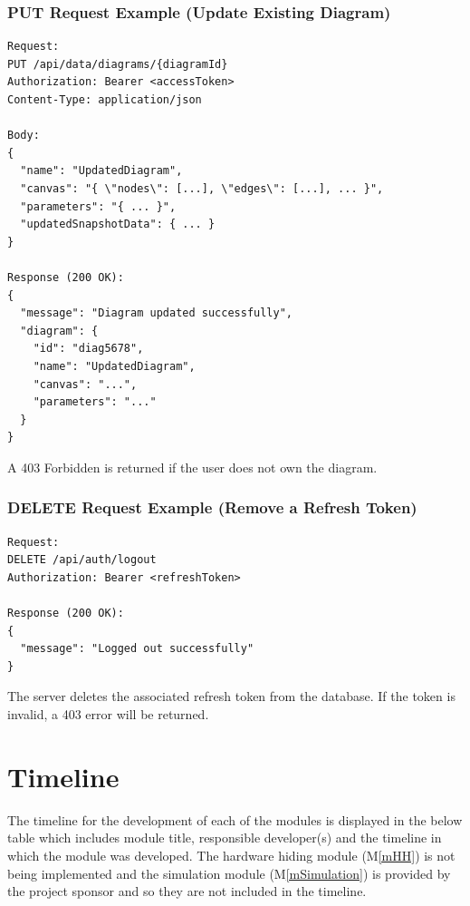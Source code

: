 \documentclass[12pt, titlepage]{article}
\newcommand{\mref}[1]{M\ref{#1}}
\begin{document}
\subsubsection{PUT Request Example (Update Existing Diagram)}

\begin{verbatim}
Request:
PUT /api/data/diagrams/{diagramId}
Authorization: Bearer <accessToken>
Content-Type: application/json

Body:
{
  "name": "UpdatedDiagram",
  "canvas": "{ \"nodes\": [...], \"edges\": [...], ... }",
  "parameters": "{ ... }",
  "updatedSnapshotData": { ... }
}

Response (200 OK):
{
  "message": "Diagram updated successfully",
  "diagram": {
    "id": "diag5678",
    "name": "UpdatedDiagram",
    "canvas": "...",
    "parameters": "..."
  }
}
\end{verbatim}

\noindent
A 403 Forbidden is returned if the user does not own the diagram.

\subsubsection{DELETE Request Example (Remove a Refresh Token)}

\begin{verbatim}
Request:
DELETE /api/auth/logout
Authorization: Bearer <refreshToken>

Response (200 OK):
{
  "message": "Logged out successfully"
}
\end{verbatim}

\noindent
The server deletes the associated refresh token from the database. If the token is invalid, a 403 error will be returned.

\section{Timeline}
The timeline for the development of each of the modules is displayed in the below table which includes module title, responsible developer(s) and the timeline in which the module was developed. The hardware hiding module (\mref{mHH}) is not being implemented and the simulation module (\mref{mSimulation}) is provided by the project sponsor and so they are not included in the timeline. 
\end{document}
